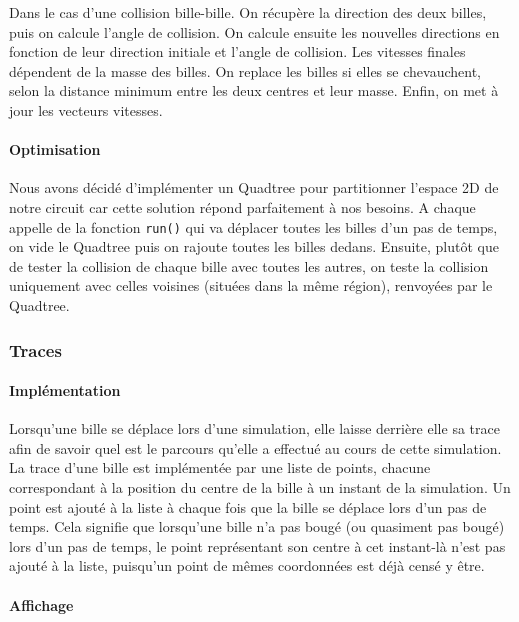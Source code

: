 \documentclass{report}
\begin{document}
Dans le cas d’une collision bille-bille. On récupère la direction des deux billes, puis on calcule l’angle de collision. On calcule ensuite les nouvelles directions en fonction de leur direction initiale et l’angle de collision. Les vitesses finales dépendent de la masse des billes. On replace les billes si elles se chevauchent, selon la distance minimum entre les deux centres et  leur masse. Enfin, on met à jour les vecteurs vitesses.

\paragraph{Optimisation}

Nous avons décidé d’implémenter un Quadtree pour partitionner l’espace 2D de notre circuit car cette solution répond parfaitement à nos besoins. A chaque appelle de la fonction \texttt{run()} qui va déplacer toutes les billes d’un pas de temps, on vide le Quadtree puis on rajoute toutes les billes dedans. Ensuite, plutôt que de tester la collision de chaque bille avec toutes les autres, on teste la collision uniquement avec celles voisines (situées dans la même région), renvoyées par le Quadtree.

\newpage
\subsubsection{Traces}

\paragraph{Implémentation}

Lorsqu’une bille se déplace lors d’une simulation, elle laisse derrière elle sa trace afin de savoir quel est le parcours qu’elle a effectué au cours de cette simulation.
La trace d’une bille est implémentée par une liste de points, chacune correspondant à la position du centre de la bille à un instant de la simulation. Un point est ajouté à la liste à chaque fois que la bille se déplace lors d’un pas de temps. Cela signifie que lorsqu’une bille n’a pas bougé (ou quasiment pas bougé) lors d’un pas de temps, le point représentant son centre à cet instant-là n’est pas ajouté à la liste, puisqu’un point de mêmes coordonnées est déjà censé y être.

\paragraph{Affichage}
\end{document}

